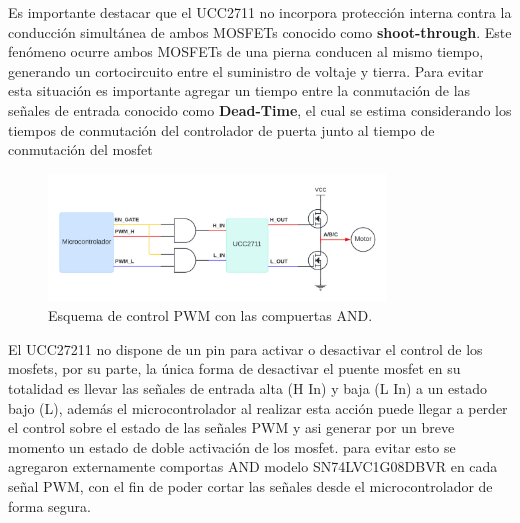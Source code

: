 \documentclass[11pt]{report}
\begin{document}
\newpage
Es importante destacar que el UCC2711 no incorpora protección interna contra la conducción simultánea de ambos MOSFETs conocido como \textbf{shoot-through}. Este fenómeno ocurre ambos MOSFETs de una pierna conducen al mismo tiempo, generando un cortocircuito entre el suministro de voltaje y tierra. Para evitar esta situación es importante agregar un tiempo entre la conmutación de las señales de entrada conocido como \textbf{Dead-Time}, el cual se estima considerando los tiempos de conmutación del controlador de puerta junto al tiempo de conmutación del mosfet

\begin{figure}[ht]
	\centering
	\includegraphics[width=0.8\textwidth]{imagenes/Diagramas/Diagramas - AND.png}
	\caption{Esquema de control PWM con las compuertas AND.}
	\label{fig:control-pwm-and}
\end{figure}
\FloatBarrier

El UCC27211 no dispone de un pin para activar o desactivar el control de los mosfets, por su parte, la única forma de desactivar el puente mosfet en su totalidad es llevar las señales de entrada alta (H In) y baja (L In) a un estado bajo (L), además el microcontrolador al realizar esta acción puede llegar a perder el control sobre el estado de las señales PWM y asi generar por un breve momento un estado de doble activación de los mosfet. para evitar esto se agregaron externamente comportas AND modelo SN74LVC1G08DBVR en cada señal PWM, con el fin de poder cortar las señales desde el microcontrolador de forma segura.
\end{document}
